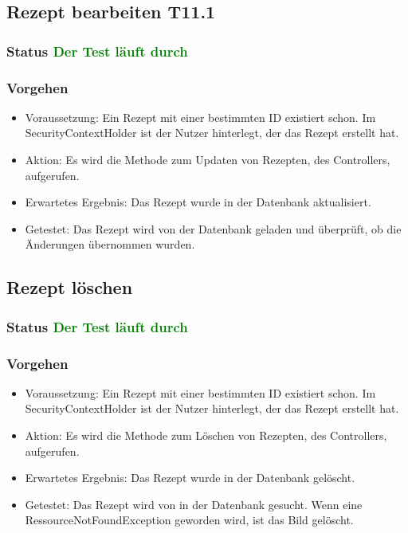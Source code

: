 \subsection{Rezept bearbeiten T11.1}
\subsubsection{Status \textcolor{green}{ Der Test läuft durch} }
\subsubsection{Vorgehen}
\begin{itemize}
	\item Voraussetzung: Ein Rezept mit einer bestimmten ID existiert schon. Im SecurityContextHolder ist der Nutzer hinterlegt, der das Rezept erstellt hat.
	\item Aktion: Es wird die Methode zum Updaten von Rezepten, des Controllers, aufgerufen.
	\item Erwartetes Ergebnis: Das Rezept wurde in der Datenbank aktualisiert.
	\item Getestet: Das Rezept wird von der Datenbank geladen und überprüft, ob die Änderungen übernommen wurden.
\end{itemize}

\subsection{Rezept löschen}
\subsubsection{Status \textcolor{green}{ Der Test läuft durch} }
\subsubsection{Vorgehen}
\begin{itemize}
	\item Voraussetzung: Ein Rezept mit einer bestimmten ID existiert schon. Im SecurityContextHolder ist der Nutzer hinterlegt, der das Rezept erstellt hat.
	\item Aktion: Es wird die Methode zum Löschen von Rezepten, des Controllers, aufgerufen.
	\item Erwartetes Ergebnis: Das Rezept wurde in der Datenbank gelöscht.
	\item Getestet: Das Rezept wird von in der Datenbank gesucht. Wenn eine RessourceNotFoundException geworden wird, ist das Bild gelöscht.
\end{itemize}

